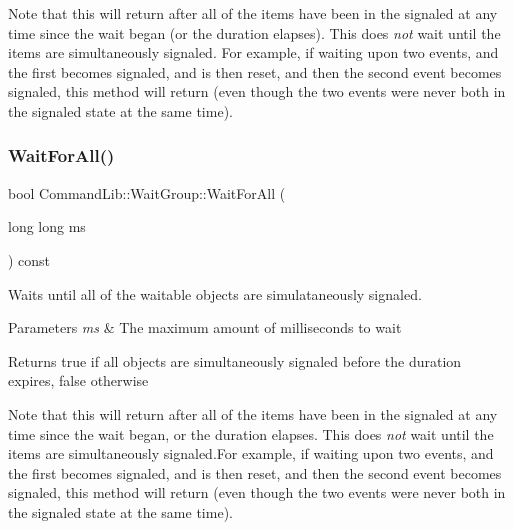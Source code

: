 Note that this will return after all of the items have been in the signaled at any time since the wait began (or the duration elapses). This does {\itshape not} wait until the items are simultaneously signaled. For example, if waiting upon two events, and the first becomes signaled, and is then reset, and then the second event becomes signaled, this method will return (even though the two events were never both in the signaled state at the same time). \mbox{\label{class_command_lib_1_1_wait_group_a9f5c6931a0eb4948a9341a8faa3c26ce}} 
\subsubsection{\texorpdfstring{Wait\+For\+All()}{WaitForAll()}\hspace{0.1cm}{\footnotesize\ttfamily [3/3]}}
{\footnotesize\ttfamily bool Command\+Lib\+::\+Wait\+Group\+::\+Wait\+For\+All (\begin{DoxyParamCaption}\item[{long long}]{ms }\end{DoxyParamCaption}) const}



Waits until all of the waitable objects are simulataneously signaled.


\begin{DoxyParams}{Parameters}
{\em ms} & The maximum amount of milliseconds to wait\\
\hline
\end{DoxyParams}
\begin{DoxyReturn}{Returns}
true if all objects are simultaneously signaled before the duration expires, false otherwise
\end{DoxyReturn}
Note that this will return after all of the items have been in the signaled at any time since the wait began, or the duration elapses. This does {\itshape not} wait until the items are simultaneously signaled.\+For example, if waiting upon two events, and the first becomes signaled, and is then reset, and then the second event becomes signaled, this method will return (even though the two events were never both in the signaled state at the same time). \mbox{\label{class_command_lib_1_1_wait_group_aa119ca1edda12cc5b33602801b399839}} 

